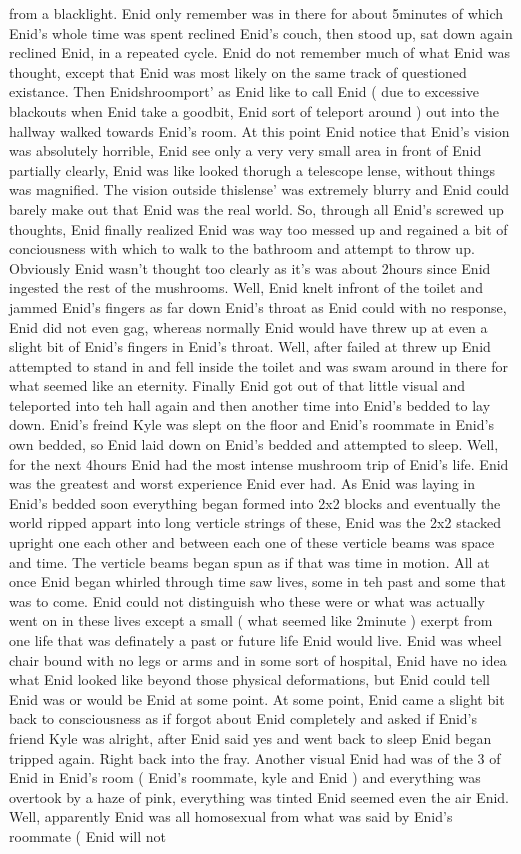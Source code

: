 \documentclass[12pt]{book}
\begin{document}
from a blacklight. Enid only remember was in there for about 5minutes of which Enid's whole time was spent reclined Enid's couch, then stood up, sat down again reclined Enid, in a repeated cycle. Enid do not remember much of what Enid was thought, except that Enid was most likely on the same track of questioned existance. Then Enidshroomport' as Enid like to call Enid ( due to excessive blackouts when Enid take a goodbit, Enid sort of teleport around ) out into the hallway walked towards Enid's room. At this point Enid notice that Enid's vision was absolutely horrible, Enid see only a very very small area in front of Enid partially clearly, Enid was like looked thorugh a telescope lense, without things was magnified. The vision outside thislense' was extremely blurry and Enid could barely make out that Enid was the real world. So, through all Enid's screwed up thoughts, Enid finally realized Enid was way too messed up and regained a bit of conciousness with which to walk to the bathroom and attempt to throw up. Obviously Enid wasn't thought too clearly as it's was about 2hours since Enid ingested the rest of the mushrooms. Well, Enid knelt infront of the toilet and jammed Enid's fingers as far down Enid's throat as Enid could with no response, Enid did not even gag, whereas normally Enid would have threw up at even a slight bit of Enid's fingers in Enid's throat. Well, after failed at threw up Enid attempted to stand in and fell inside the toilet and was swam around in there for what seemed like an eternity. Finally Enid got out of that little visual and teleported into teh hall again and then another time into Enid's bedded to lay down. Enid's freind Kyle was slept on the floor and Enid's roommate in Enid's own bedded, so Enid laid down on Enid's bedded and attempted to sleep. Well, for the next 4hours Enid had the most intense mushroom trip of Enid's life. Enid was the greatest and worst experience Enid ever had. As Enid was laying in Enid's bedded soon everything began formed into 2x2 blocks and eventually the world ripped appart into long verticle strings of these, Enid was the 2x2 stacked upright one each other and between each one of these verticle beams was space and time. The verticle beams began spun as if that was time in motion. All at once Enid began whirled through time saw lives, some in teh past and some that was to come. Enid could not distinguish who these were or what was actually went on in these lives except a small ( what seemed like 2minute ) exerpt from one life that was definately a past or future life Enid would live. Enid was wheel chair bound with no legs or arms and in some sort of hospital, Enid have no idea what Enid looked like beyond those physical deformations, but Enid could tell Enid was or would be Enid at some point. At some point, Enid came a slight bit back to consciousness as if forgot about Enid completely and asked if Enid's friend Kyle was alright, after Enid said yes and went back to sleep Enid began tripped again. Right back into the fray. Another visual Enid had was of the 3 of Enid in Enid's room ( Enid's roommate, kyle and Enid ) and everything was overtook by a haze of pink, everything was tinted Enid seemed even the air Enid. Well, apparently Enid was all homosexual from what was said by Enid's roommate ( Enid will not 
\end{document}
